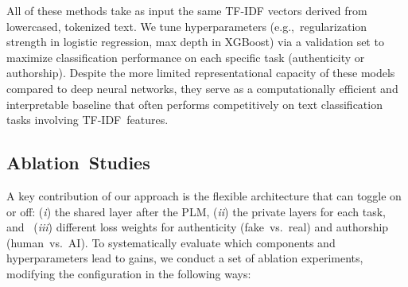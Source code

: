\documentclass[electronics,article,accept,pdftex,moreauthors,electronics]{Definitions/mdpi}
\begin{document}
All of these methods take as input the same TF-IDF vectors derived from lowercased, tokenized text. We tune hyperparameters (e.g.,~regularization strength in logistic regression, max depth in  XGBoost) via a validation set to maximize classification performance on each specific task (authenticity or authorship). Despite the more limited representational capacity of these models compared to deep neural networks, they serve as a computationally efficient and interpretable baseline that often performs competitively on text classification tasks involving TF-IDF~features.


\subsection{Ablation~Studies}

A key contribution of our approach is the flexible architecture that can toggle on or off: 
(\textit{i}) the shared layer after the PLM, 
(\textit{ii}) the private layers for each task, and~
(\textit{iii}) different loss weights for authenticity (fake~vs.~real) and authorship (human~vs.~AI). To systematically evaluate which components and hyperparameters lead to gains, we conduct a set of ablation experiments, modifying the configuration in the following ways:
\end{document}
